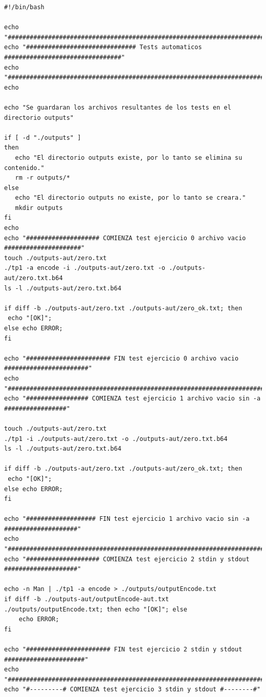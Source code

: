 \documentclass[11pt,a4paper]{article}
\begin{document}
\begin{lstlisting}
#!/bin/bash

echo "##################################################################################"
echo "############################## Tests automaticos  ################################"
echo "##################################################################################"
echo

echo "Se guardaran los archivos resultantes de los tests en el directorio outputs"

if [ -d "./outputs" ]
then
   echo "El directorio outputs existe, por lo tanto se elimina su contenido."
   rm -r outputs/*
else
   echo "El directorio outputs no existe, por lo tanto se creara."
   mkdir outputs
fi
echo
echo "#################### COMIENZA test ejercicio 0 archivo vacio #####################"
touch ./outputs-aut/zero.txt
./tp1 -a encode -i ./outputs-aut/zero.txt -o ./outputs-aut/zero.txt.b64
ls -l ./outputs-aut/zero.txt.b64

if diff -b ./outputs-aut/zero.txt ./outputs-aut/zero_ok.txt; then
 echo "[OK]";
else echo ERROR;
fi

echo "####################### FIN test ejercicio 0 archivo vacio #######################"
echo "##################################################################################"
echo "################# COMIENZA test ejercicio 1 archivo vacio sin -a #################"

touch ./outputs-aut/zero.txt
./tp1 -i ./outputs-aut/zero.txt -o ./outputs-aut/zero.txt.b64
ls -l ./outputs-aut/zero.txt.b64

if diff -b ./outputs-aut/zero.txt ./outputs-aut/zero_ok.txt; then
 echo "[OK]";
else echo ERROR;
fi

echo "################### FIN test ejercicio 1 archivo vacio sin -a ####################"
echo "##################################################################################"
echo "#################### COMIENZA test ejercicio 2 stdin y stdout ####################"

echo -n Man | ./tp1 -a encode > ./outputs/outputEncode.txt
if diff -b ./outputs-aut/outputEncode-aut.txt ./outputs/outputEncode.txt; then echo "[OK]"; else
	echo ERROR;
fi

echo "####################### FIN test ejercicio 2 stdin y stdout ######################"
echo "##################################################################################"
echo "#---------# COMIENZA test ejercicio 3 stdin y stdout #--------#"


\end{lstlisting}
\end{document}
